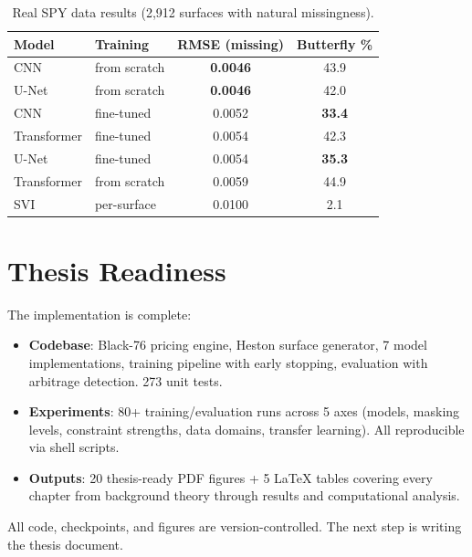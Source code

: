 \documentclass[11pt, a4paper]{article}
\begin{document}
\begin{table}[H]
    \centering
    \caption{Real SPY data results (2{,}912 surfaces with natural missingness).}
    \label{tab:real}
    \begin{tabular}{llcc}
        \toprule
        Model & Training & RMSE (missing) & Butterfly \% \\
        \midrule
        CNN         & from scratch  & \textbf{0.0046} & 43.9 \\
        U-Net       & from scratch  & \textbf{0.0046} & 42.0 \\
        CNN         & fine-tuned    & 0.0052 & \textbf{33.4} \\
        Transformer & fine-tuned    & 0.0054 & 42.3 \\
        U-Net       & fine-tuned    & 0.0054 & \textbf{35.3} \\
        Transformer & from scratch  & 0.0059 & 44.9 \\
        \midrule
        SVI         & per-surface   & 0.0100 & 2.1 \\
        \bottomrule
    \end{tabular}
\end{table}

\section{Thesis Readiness}

The implementation is complete:

\begin{itemize}
    \item \textbf{Codebase}: Black-76 pricing engine, Heston surface generator, 7 model implementations, training pipeline with early stopping, evaluation with arbitrage detection. 273 unit tests.
    \item \textbf{Experiments}: 80+ training/evaluation runs across 5 axes (models, masking levels, constraint strengths, data domains, transfer learning). All reproducible via shell scripts.
    \item \textbf{Outputs}: 20 thesis-ready PDF figures + 5 LaTeX tables covering every chapter from background theory through results and computational analysis.
\end{itemize}

All code, checkpoints, and figures are version-controlled. The next step is writing the thesis document.
\end{document}
